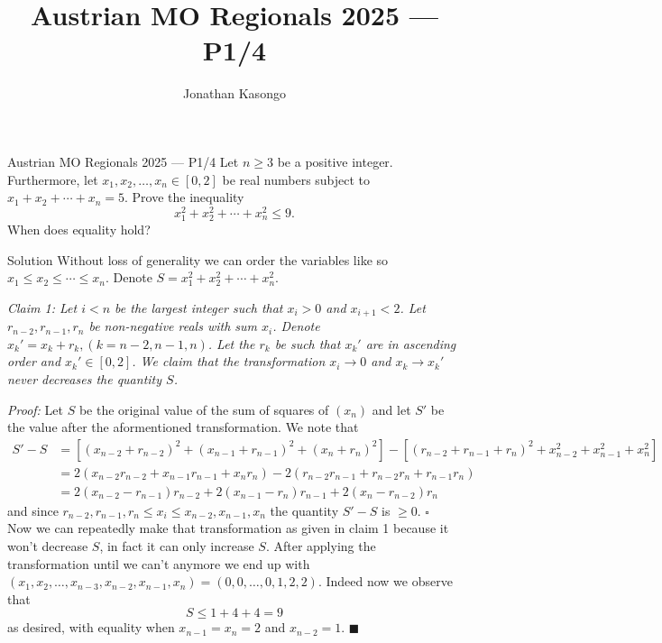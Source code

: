 \documentclass{article}
\author{Jonathan Kasongo}
\title{Austrian MO Regionals 2025 --- P1/4}
\begin{document}
\maketitle

\begin{problem}{Austrian MO Regionals 2025 --- P1/4}
Let $n \geqslant 3$ be a positive integer. Furthermore,
let $x_1, x_2,\ldots, x_n \in [0, 2]$ be real numbers subject to
$x_1 + x_2 +\cdots + x_n = 5$. Prove the inequality
$$x_1^2 + x_2^2 + \cdots + x_n^2 \leqslant 9.$$
When does equality hold?
\end{problem}

\begin{solution}{Solution}
Without loss of generality we can order the variables like so
$x_1 \leq x_2 \leq \cdots \leq x_n$. Denote
$S = x_1^2 + x_2^2 + \cdots + x_n^2$.\vspace{0.2cm}

\textit{Claim 1: Let $i < n$ be the largest integer such that
$x_i > 0$ and $x_{i+1} < 2$. Let
$r_{n-2}, r_{n-1}, r_{n}$ be non-negative reals with sum $x_i$.
Denote $x_k' = x_k + r_k, (k = n-2, n-1, n)$. Let the $r_k$ be such that
$x_k'$ are in ascending order and $x_k' \in [0,2]$. We claim that
the transformation $x_i \rightarrow 0$ and $x_k \rightarrow x_k'$ never
decreases the quantity $S$.} \vspace{0.2cm}

\textit{Proof:} Let $S$ be the original value of the sum of squares of
$(x_n)$ and let $S'$ be the value after the aformentioned transformation.
We note that
\[
\begin{aligned}
S' - S &= \left[ (x_{n-2}+r_{n-2})^2 + (x_{n-1}+r_{n-1})^2 +
(x_{n}+r_{n})^2 \right] -
\left[ (r_{n-2} + r_{n-1} + r_n)^2 + x_{n-2}^2 + x_{n-1}^2 + x_n^2 \right]\\
&= 2(x_{n-2}r_{n-2} + x_{n-1}r_{n-1} + x_{n}r_{n}) -
2(r_{n-2}r_{n-1} + r_{n-2}r_n + r_{n-1}r_n)\\
&= 2(x_{n-2} - r_{n-1})r_{n-2} + 2(x_{n-1} - r_n)r_{n-1} + 2(x_n - r_{n-2})r_n
\end{aligned}
\]
and since $r_{n-2}, r_{n-1}, r_n \leq x_i \leq x_{n-2}, x_{n-1}, x_n$
the quantity $S' - S$ is $\geq 0$. $\square$
\\

Now we can repeatedly make that transformation as given in claim 1 because
it won't decrease $S$, in fact it can only increase $S$. After applying the
transformation until we can't anymore we end up with
$(x_1, x_2, \ldots, x_{n-3}, x_{n-2}, x_{n-1}, x_n) =
(0, 0, \ldots, 0, 1, 2, 2)$. Indeed now we observe that
$$
S \leq 1 + 4 + 4 = 9
$$
as desired, with equality when $x_{n-1} = x_{n} = 2$ and $x_{n-2} = 1$.
$\blacksquare$
\end{solution}
\end{document}
